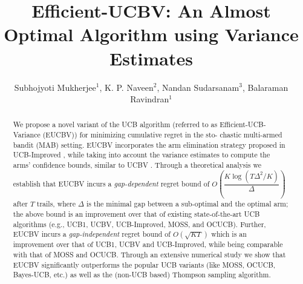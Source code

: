 \documentclass{llncs}
\begin{document}
%
\frontmatter          %
%
\pagestyle{headings}  %

\mainmatter              %
%
\title{Efficient-UCBV: An Almost Optimal Algorithm using Variance Estimates}
%
%
\author{Subhojyoti Mukherjee${}^1$, K. P. Naveen${}^2$, Nandan
Sudarsanam${}^3$, Balaraman Ravindran${}^1$}
%
%
%

\maketitle              %

\begin{abstract}
We propose a novel variant of the UCB algorithm (referred to as Efficient-UCB-Variance (EUCBV)) for minimizing cumulative regret in the sto- chastic multi-armed bandit (MAB) setting. EUCBV incorporates the arm elimination strategy proposed in UCB-Improved \citep{auer2010ucb}, while taking into account the variance estimates to compute the arms' confidence bounds, similar to UCBV \citep{audibert2009exploration}. Through a theoretical analysis we establish that EUCBV incurs a \emph{gap-dependent} regret bound of {\scriptsize $O\left( \dfrac{K\log (T\Delta^2 /K)}{\Delta}\right)$} after $T$ trails, where $\Delta$ is the minimal gap between a sub-optimal and the optimal arm; the above bound is an improvement over that of existing state-of-the-art UCB algorithms (e.g.,  UCB1, UCBV, UCB-Improved, MOSS, and OCUCB). Further, EUCBV incurs a \emph{gap-independent} regret bound of {\scriptsize $O\left(\sqrt{KT}\right)$}  which is an improvement over that of UCB1, UCBV and UCB-Improved, while being comparable with that of MOSS and OCUCB. Through an extensive numerical study we show that EUCBV significantly outperforms the popular UCB variants (like MOSS, OCUCB, Bayes-UCB, etc.) as well as the (non-UCB based) Thompson sampling algorithm. 

\end{abstract}
\end{document}

